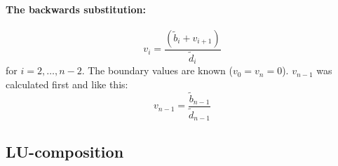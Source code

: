 \paragraph{The backwards substitution:\hspace{4cm}}

\hspace{1cm}\linebreak
\[
v_i = \frac{\left(\tilde{b}_i + v_{i+1}\right)}{\tilde{d}_i}
\]
for $i = 2, \dots, n-2 $. The boundary values are known ($v_0 = v_n = 0$). $v_{n-1}$ was calculated first and like this:
\[
v_{n-1} = \frac{\tilde{b}_{n-1}}{\tilde{d}_{n-1}}
\]

\subsection{LU-composition}